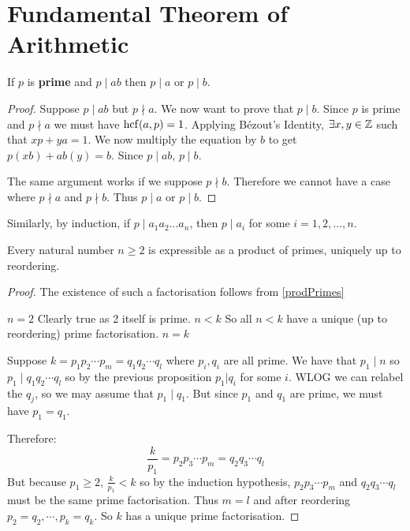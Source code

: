 \documentclass[../main.tex]{subfiles}
\begin{document}
\section{Fundamental Theorem of Arithmetic}
\begin{proposition}
  If $p$ is \textbf{prime} and $p \mid ab$ then $p \mid a$ or $p \mid b$.
\end{proposition}
\begin{proof}
  Suppose $p \mid ab$ but $p \nmid a$. We now want to prove that $p \mid b$.
  Since $p$ is prime and $p \nmid a$ we must have $\operatorname{hcf}(a, p) = 1$.
  Applying B\'ezout's Identity, $\exists x, y \in \mathbb{Z}$ such that $xp + ya = 1$.
  We now multiply the equation by $b$ to get $p(xb) + ab(y) = b$.
  Since $p \mid ab$, $p \mid b$.

  The same argument works if we suppose $p \nmid b$.
  Therefore we cannot have a case where $p \nmid a$ and $p \nmid b$.
  Thus $p \mid a$ or $p \mid b$.
\end{proof}
\begin{remark}
  Similarly, by induction, if $p \mid a_1 a_2 \ldots a_n$, then $p \mid a_i$  for some $i = 1, 2, \ldots, n$.
\end{remark}
\begin{theorem}
  Every natural number $n \geq 2$ is expressible as a product of primes, uniquely up to reordering.
\end{theorem}
\begin{proof}
  The existence of such a factorisation follows from \cref{prodPrimes}\par
  \induction
  {$n = 2$}{
    Clearly true as 2 itself is prime.
  }
  {$n < k$}{
    So all $n < k$ have a unique (up to reordering) prime factorisation.
  }
  {$n = k$}{
    Suppose $k = p_1 p_2 \cdots p_m = q_1 q_2 \cdots q_l$ where $p_i, q_i$ are all prime.
    We have that $p_1 \mid n$ so $p_1 \mid q_1 q_2 \cdots q_l$ so by the previous proposition $p_1 | q_i$ for some $i$.
    WLOG we can relabel the $q_j$, so we may assume that $p_1 \mid q_1$.
    But since $p_1$ and $q_1$ are prime, we must have $p_1 = q_1$.

    Therefore:
    \[
      \frac{k}{p_1} = p_2 p_3\cdots p_m = q_2 q_3 \cdots q_l
    \]
    But because $p_1 \geq 2$, $\frac{k}{p_1} < k$ so by the induction hypothesis, $p_2 p_3 \cdots p_m$ and $q_2 q_3 \cdots q_l$ must be the same prime factorisation.
    Thus $m=l$ and after reordering $p_2 = q_2, \cdots, p_k = q_k$.
    So $k$ has a unique prime factorisation.
  }
\end{proof}
\end{document}
